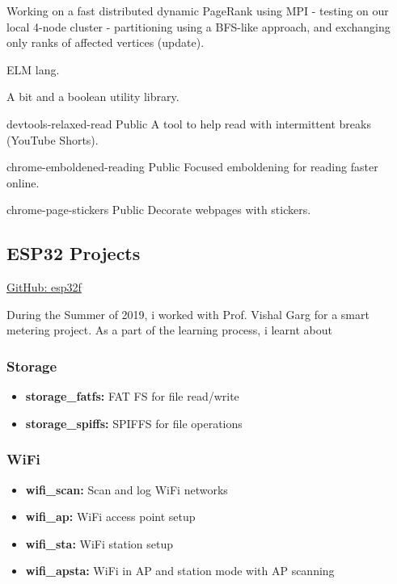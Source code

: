Working on a fast distributed dynamic PageRank using MPI - testing on our local 4-node cluster - partitioning using a BFS-like approach, and exchanging only ranks of affected vertices (update).
















ELM lang.

A bit and a boolean utility library.





devtools-relaxed-read Public
A tool to help read with intermittent breaks (YouTube Shorts).

chrome-emboldened-reading Public
Focused emboldening for reading faster online.

chrome-page-stickers Public
Decorate webpages with stickers.
















\subsection{ESP32 Projects}
\href{https://github.com/orgs/esp32f}{GitHub: esp32f}

During the Summer of 2019, i worked with Prof. Vishal Garg for a smart metering project. As a part of the learning process, i learnt about 

\subsubsection{Storage}
\begin{itemize}
    \item \textbf{storage\_fatfs:} FAT FS for file read/write
    \item \textbf{storage\_spiffs:} SPIFFS for file operations
\end{itemize}

\subsubsection{WiFi}
\begin{itemize}
    \item \textbf{wifi\_scan:} Scan and log WiFi networks
    \item \textbf{wifi\_ap:} WiFi access point setup
    \item \textbf{wifi\_sta:} WiFi station setup
    \item \textbf{wifi\_apsta:} WiFi in AP and station mode with AP scanning
\end{itemize}

